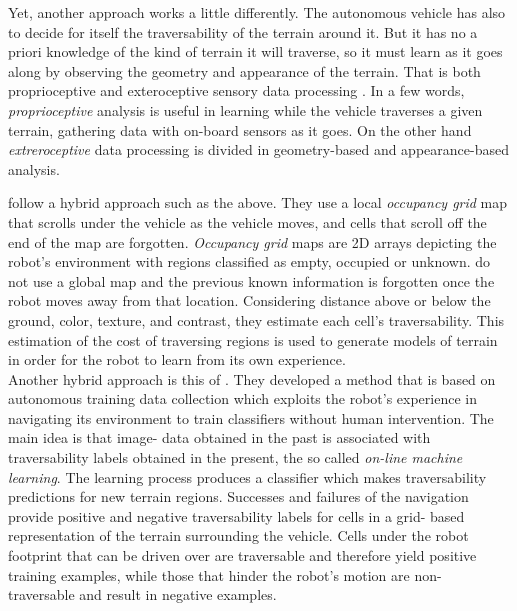 \documentclass[12pt,a4paper,table,dvipsnames,tikz]{report}
\newcommand{\term}{\textit}
\newcommand{\acronym}{\MakeUppercase}
\begin{document}
	Yet, another approach works a little differently. The autonomous 
	vehicle has also to decide for itself the traversability of the terrain 
	around it. But it has no a priori knowledge of the kind of terrain it will 
	traverse, so it must learn as it goes along by observing the geometry and 
	appearance of the terrain. That is both proprioceptive and exteroceptive sensory 
	data processing \citep{Papadakis}. In a few words, \term{proprioceptive} analysis 
	is useful in learning while the vehicle traverses a given terrain, gathering data 
	with on-board sensors as it goes. On the other hand \term{extreroceptive} data 
	processing is divided in geometry-based and appearance-based analysis. 
	\par
	\citet{Shneier} follow a hybrid approach such as the above. They use a local 
	\term{occupancy grid} map that scrolls under the vehicle as the vehicle moves,
	and cells that scroll off the end of the map are forgotten. 
	\term{Occupancy grid} maps \citep{Moravec} are \acronym{2d} arrays depicting the 
	robot’s environment with regions classified as empty, occupied or unknown.
	\citet{Shneier} do not 
	use a global map and the previous known information is forgotten once the robot 
	moves away from that location. Considering distance above or below the ground, 
	color, texture, and contrast, they estimate each cell’s traversability. 
	This estimation of the cost of traversing regions is used to generate models of 
	terrain in order for the robot to learn from its own experience.
	\\
	
	Another hybrid approach is this of \citet{Kim}. They 
	developed a method that is based on autonomous training data collection which 
	exploits the robot’s experience in navigating its environment to train 
	classifiers without human intervention. The main idea is that image-
	data obtained in the past is associated with traversability labels 
	obtained in the present, the so called \term{on-line machine learning}. The 
	learning process produces a classifier which makes traversability 
	predictions for new terrain regions. Successes and failures of the navigation 
	provide positive and negative traversability labels for cells in a grid-
	based representation of the terrain surrounding the vehicle. Cells under the 
	robot footprint that can be driven over are traversable and therefore yield 
	positive training examples, while those that hinder the robot’s motion are non-
	traversable and result in negative examples.
	\\
	
\end{document}
